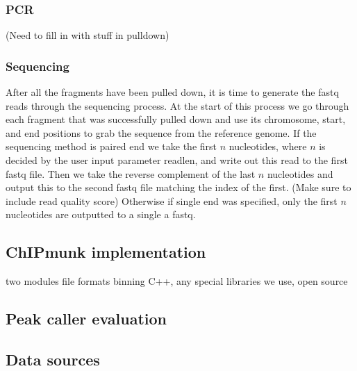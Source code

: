 \documentclass[12pt]{article}
\begin{document}
\subsubsection*{PCR}
(Need to fill in with stuff in pulldown)

\subsubsection*{Sequencing}

After all the fragments have been pulled down, it is time to generate the fastq reads through the sequencing process. At the start of this process we go through each fragment that was successfully pulled down and use its chromosome, start, and end positions to grab the sequence from the reference genome. If the sequencing method is paired end we take the first $n$ nucleotides, where $n$ is decided by the user input parameter readlen, and write out this read to the first fastq file. Then we take the reverse complement of the last $n$ nucleotides and output this to the second fastq file matching the index of the first. (Make sure to include read quality score) Otherwise if single end was specified, only the first $n$ nucleotides are outputted to a single a fastq. 


\subsection*{ChIPmunk implementation}

two modules
file formats
binning
C++, any special libraries we use, open source

\subsection*{Peak caller evaluation}

\subsection*{Data sources}
\end{document}
